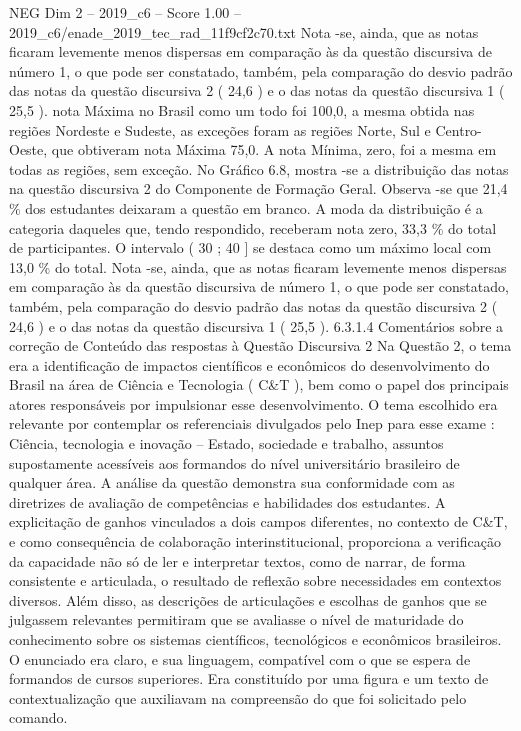 \begin{textsample}{NEG Dim 2 – 2019\_c6 – Score 1.00 – 2019\_c6/enade\_2019\_tec\_rad\_11f9cf2c70.txt}
Nota -se, ainda, que as notas ficaram levemente menos dispersas em comparação às da questão discursiva de número 1, o que pode ser constatado, também, pela comparação do desvio padrão das notas da questão discursiva 2 ( 24,6 ) e o das notas da questão discursiva 1 ( 25,5 ). nota Máxima no Brasil como um todo foi 100,0, a mesma obtida nas regiões Nordeste e Sudeste, as exceções foram as regiões Norte, Sul e Centro-Oeste, que obtiveram nota Máxima 75,0.
A nota Mínima, zero, foi a mesma em todas as regiões, sem exceção.
No Gráfico 6.8, mostra -se a distribuição das notas na questão discursiva 2 do Componente de Formação Geral.
Observa -se que 21,4 \% dos estudantes deixaram a questão em branco.
A moda da distribuição é a categoria daqueles que, tendo respondido, receberam nota zero, 33,3 \% do total de participantes.
O intervalo ( 30 ; 40 ] se destaca como um máximo local com 13,0 \% do total.
Nota -se, ainda, que as notas ficaram levemente menos dispersas em comparação às da questão discursiva de número 1, o que pode ser constatado, também, pela comparação do desvio padrão das notas da questão discursiva 2 ( 24,6 ) e o das notas da questão discursiva 1 ( 25,5 ). 6.3.1.4 Comentários sobre a correção de Conteúdo das respostas à Questão Discursiva 2 Na Questão 2, o tema era a identificação de impactos científicos e econômicos do desenvolvimento do Brasil na área de Ciência e Tecnologia ( C\&T ), bem como o papel dos principais atores responsáveis por impulsionar esse desenvolvimento.
O tema escolhido era relevante por contemplar os referenciais divulgados pelo Inep para esse exame : Ciência, tecnologia e inovação – Estado, sociedade e trabalho, assuntos supostamente acessíveis aos formandos do nível universitário brasileiro de qualquer área.
A análise da questão demonstra sua conformidade com as diretrizes de avaliação de competências e habilidades dos estudantes.
A explicitação de ganhos vinculados a dois campos diferentes, no contexto de C\&T, e como consequência de colaboração interinstitucional, proporciona a verificação da capacidade não só de ler e interpretar textos, como de narrar, de forma consistente e articulada, o resultado de reflexão sobre necessidades em contextos diversos.
Além disso, as descrições de articulações e escolhas de ganhos que se julgassem relevantes permitiram que se avaliasse o nível de maturidade do conhecimento sobre os sistemas científicos, tecnológicos e econômicos brasileiros.
O enunciado era claro, e sua linguagem, compatível com o que se espera de formandos de cursos superiores.
Era constituído por uma figura e um texto de contextualização que auxiliavam na compreensão do que foi solicitado pelo comando.

\end{textsample}
